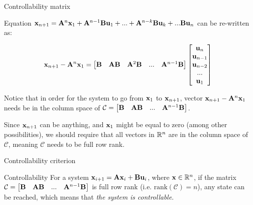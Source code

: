 \documentclass{beamer}
\begin{document}
\begin{frame}{Controllability matrix}
\begin{flushleft}

Equation $\mathbf{x}_{n+1} = \mathbf{A}^n \mathbf{x}_1 + \mathbf{A}^{n-1} \mathbf{B} \mathbf{u}_1 + ... 
+ \mathbf{A}^{n - k} \mathbf{B} \mathbf{u}_{k} + ...
\mathbf{B} \mathbf{u}_n$ can be re-written as:

\begin{equation}
    \mathbf{x}_{n+1} - \mathbf{A}^n \mathbf{x}_1 = 
    \begin{bmatrix}
    \mathbf{B} &
    \mathbf{A} \mathbf{B} &
    \mathbf{A}^2 \mathbf{B} & ... &
    \mathbf{A}^{n - 1} \mathbf{B}
    \end{bmatrix}    
    \begin{bmatrix}
    \mathbf{u}_{n} \\
    \mathbf{u}_{n-1} \\
    \mathbf{u}_{n-2} \\ ... \\
    \mathbf{u}_{1}
    \end{bmatrix}
\end{equation}

Notice that in order for the system to go from $\mathbf{x}_1$ to $\mathbf{x}_{n+1}$, vector $\mathbf{x}_{n+1} - \mathbf{A}^n \mathbf{x}_1$ needs be in the column space of $\mathcal{C} = \begin{bmatrix}
    \mathbf{B} &
    \mathbf{A} \mathbf{B} & ... &
    \mathbf{A}^{n - 1} \mathbf{B}
    \end{bmatrix}$.

Since $\mathbf{x}_{n+1}$ can be anything, and $\mathbf{x}_1$ might be equal to zero (among other possibilities), we should require that all vectors in $\mathbb{R}^n$ are in the column space of $\mathcal{C}$, meaning $\mathcal{C}$ needs to be full row rank.

\end{flushleft}
\end{frame}


\begin{frame}{Controllability criterion}
\begin{flushleft}

\begin{block}{Controllability}
For a system $\mathbf{x}_{i+1} = \mathbf{A}  \mathbf{x}_i + \mathbf{B} \mathbf{u}_i$, where $\mathbf{x} \in \mathbb{R}^n$, if the matrix $\mathcal{C} = \begin{bmatrix}
    \mathbf{B} &
    \mathbf{A} \mathbf{B} & ... &
    \mathbf{A}^{n - 1} \mathbf{B}
    \end{bmatrix}$ is full row rank (i.e. $\text{rank}(\mathcal{C}) = n$), any state can be reached, which means that \emph{the system is controllable}.
\end{block}

\end{flushleft}
\end{frame}
\end{document}
